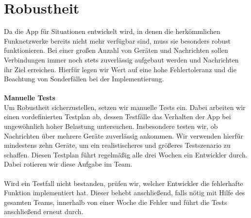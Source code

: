   \section{Robustheit}
    Da die App für Situationen entwickelt wird, in denen die herkömmlichen Funknetzwerke bereits nicht mehr verfügbar sind, muss sie besonders robust funktionieren. Bei einer großen Anzahl von Geräten und Nachrichten sollen Verbindungen immer noch stets zuverlässig aufgebaut werden und Nachrichten ihr Ziel erreichen. Hierfür legen wir Wert auf eine hohe Fehlertoleranz und die Beachtung von Sonderfällen bei der Implementierung.\\\\
    \textbf{Manuelle Tests}\\
    Um Robustheit sicherzustellen, setzen wir manuelle Tests ein. Dabei arbeiten wir einen vordefinierten Testplan ab, dessen Testfälle das Verhalten der App bei ungewöhnlich hoher Belastung untersuchen. Insbesondere testen wir, ob Nachrichten über mehrere Geräte zuverlässig ankommen. Wir verwenden hierfür mindestens zehn Geräte, um ein realistischeres und größeres Testszenario zu schaffen. Diesen Testplan führt regelmäßig alle drei Wochen ein Entwickler durch. Dabei rotieren wir diese Aufgabe im Team.\\\\
    Wird ein Testfall nicht bestanden, prüfen wir, welcher Entwickler die fehlerhafte Funktion implementiert hat. Dieser behebt anschließend, falls nötig mit Hilfe des gesamten Teams, innerhalb von einer Woche die Fehler und führt die Tests anschließend erneut durch.

